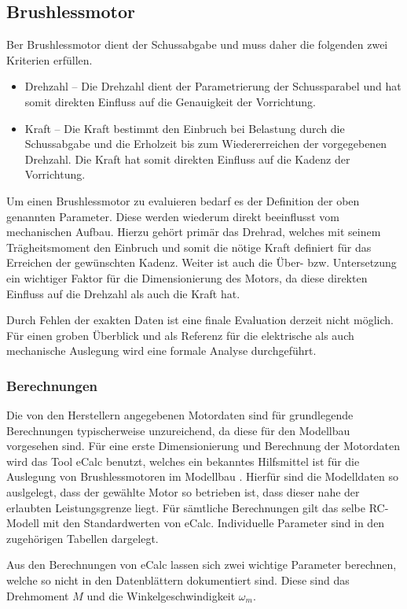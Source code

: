 \subsection{Brushlessmotor}
Ber Brushlessmotor dient der Schussabgabe und muss daher die folgenden
zwei Kriterien erfüllen.

\begin{itemize}
	\item Drehzahl -- Die Drehzahl dient der Parametrierung der
		Schussparabel und hat somit direkten Einfluss auf die
		Genauigkeit der Vorrichtung.
	\item Kraft -- Die Kraft bestimmt den Einbruch bei Belastung durch
		die Schussabgabe und die Erholzeit bis zum Wiedererreichen
		der vorgegebenen Drehzahl. Die Kraft hat somit direkten
		Einfluss auf die Kadenz der Vorrichtung.
\end{itemize}

Um einen Brushlessmotor zu evaluieren bedarf es der Definition der oben
genannten Parameter. Diese werden wiederum direkt beeinflusst vom 
mechanischen Aufbau. Hierzu gehört primär das Drehrad, welches mit seinem
Trägheitsmoment den Einbruch und somit die nötige Kraft definiert für das
Erreichen der gewünschten Kadenz. Weiter ist auch die Über- bzw.
Untersetzung ein wichtiger Faktor für die Dimensionierung des Motors, da
diese direkten Einfluss auf die Drehzahl als auch die Kraft hat.

Durch Fehlen der exakten Daten ist eine finale Evaluation derzeit nicht
möglich. Für einen groben Überblick und als Referenz für die elektrische
als auch mechanische Auslegung wird eine formale Analyse durchgeführt.

\subsubsection{Berechnungen}
Die von den Herstellern angegebenen Motordaten sind für grundlegende
Berechnungen typischerweise unzureichend, da diese für den Modellbau
vorgesehen sind. Für eine erste Dimensionierung und Berechnung der
Motordaten wird das Tool eCalc benutzt, welches ein bekanntes
Hilfsmittel ist für die Auslegung von Brushlessmotoren im Modellbau
\cite{ecalc}. Hierfür sind die Modelldaten so auslgelegt, dass der
gewählte Motor so betrieben ist, dass dieser nahe der erlaubten
Leistungsgrenze liegt. Für sämtliche Berechnungen gilt das selbe
RC-Modell mit den Standardwerten von eCalc. Individuelle Parameter
sind in den zugehörigen Tabellen dargelegt.

Aus den Berechnungen von eCalc lassen sich zwei wichtige Parameter
berechnen, welche so nicht in den Datenblättern dokumentiert sind.
Diese sind das Drehmoment $M$ und die Winkelgeschwindigkeit $\omega_m$.

